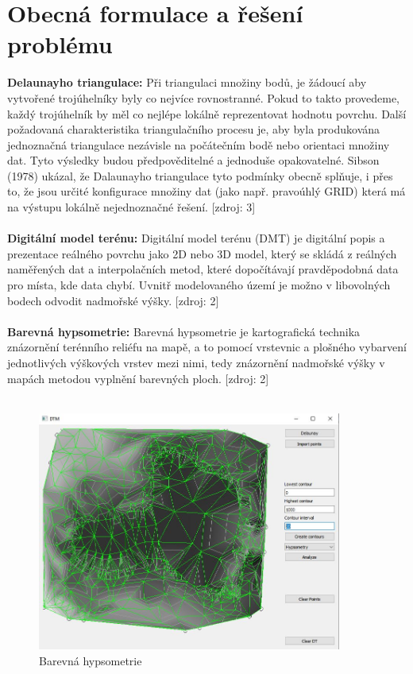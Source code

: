 \documentclass[a4paper, 12pt]{article}
\begin{document}
\newpage
\section{Obecná formulace a řešení problému}
\textbf{Delaunayho triangulace:} Při triangulaci množiny bodů, je žádoucí aby vytvořené trojúhelníky byly co nejvíce rovnostranné. Pokud to takto provedeme, každý trojúhelník by měl co nejlépe lokálně reprezentovat hodnotu povrchu. Další požadovaná charakteristika triangulačního procesu je, aby byla produkována jednoznačná triangulace nezávisle na počátečním bodě nebo orientaci množiny dat. Tyto výsledky budou předpověditelné a jednoduše opakovatelné. Sibson (1978) ukázal, že Dalaunayho triangulace tyto podmínky obecně splňuje, i přes to, že jsou určité konfigurace množiny dat (jako např. pravoúhlý GRID) která má na výstupu lokálně nejednoznačné řešení. [zdroj: 3]\\
\\
\textbf{Digitální model terénu:} Digitální model terénu (DMT) je digitální popis a prezentace reálného povrchu jako 2D nebo 3D model, který se skládá z reálných naměřených dat a interpolačních metod, které dopočítávají pravděpodobná data pro místa, kde data chybí. Uvnitř modelovaného území je možno v libovolných bodech odvodit nadmořské výšky. [zdroj: 2]\\
\\
\textbf{Barevná hypsometrie:} Barevná hypsometrie je kartografická technika znázornění terénního reliéfu na mapě, a to pomocí vrstevnic a plošného vybarvení jednotlivých výškových vrstev mezi nimi, tedy znázornění nadmořské výšky v mapách metodou vyplnění barevných ploch. [zdroj: 2]\\
\\

\begin{figure}[h!]
	\centering
	\includegraphics[width=10cm]{test25.jpg}
	\caption{Barevná hypsometrie}
\end{figure}
\end{document}

